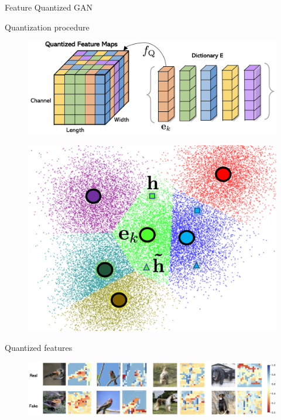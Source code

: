 \documentclass{beamer}
\begin{document}
\begin{frame}{Feature Quantized GAN}
	\begin{block}{Quantization procedure}
		\begin{minipage}[t]{0.65\columnwidth}
			\begin{figure}
				\centering
				\includegraphics[width=\linewidth]{figs/fqgan_cnn.png}
			\end{figure}
		\end{minipage}%
		\begin{minipage}[t]{0.35\columnwidth}
			\begin{figure}
				\centering
				\includegraphics[width=0.9\linewidth]{figs/fqgan_lookup}
			\end{figure}
		\end{minipage}
	\end{block}
	\begin{block}{Quantized features}
		\begin{figure}
			\centering
			\includegraphics[width=\linewidth]{figs/fqgan_features}
		\end{figure}
	\end{block}
\end{frame}
\end{document}
